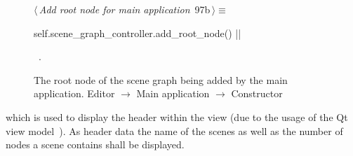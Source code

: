 \documentclass[%
    a4paper,    %
    justified,  %
    nobib,      %
    openany     %
]{tufte-book}
\makeatletter
\renewcommand{\label}[1]{\@tufte@label{##1}}%
\makeatother
\begin{document}
\begin{figure}[!htbp]
\begin{flushleft} \small
\begin{minipage}{\linewidth}\label{scrap28}\raggedright\small
{} $\langle\,${\itshape Add root node for main application}\nobreak\ {\footnotesize {97b}}$\,\rangle\equiv$
\vspace{-1ex}
\begin{pythoncode}
self.scene_graph_controller.add_root_node()
|\NWsep|
\end{pythoncode}
\vspace{1.5ex}
\footnotesize
\begin{list}{}{\setlength{\itemsep}{-\parsep}\setlength{\itemindent}{-\leftmargin}}
\item \NWtxtMacroRefIn\ .

\item{}
\end{list}
\end{minipage}\vspace{4ex}
\end{flushleft}
\caption{The root node of the scene graph being added by the main application.
  \newline{}\newline{}Editor $\rightarrow$ Main application $\rightarrow$
  Constructor}
\end{figure}

 which
is used to display the header within the view (due to the usage of the Qt view
model~\cite{qt-mvp-2017}). As header data the name of the
scenes as well as the number of nodes a scene contains shall be displayed.
\end{document}
